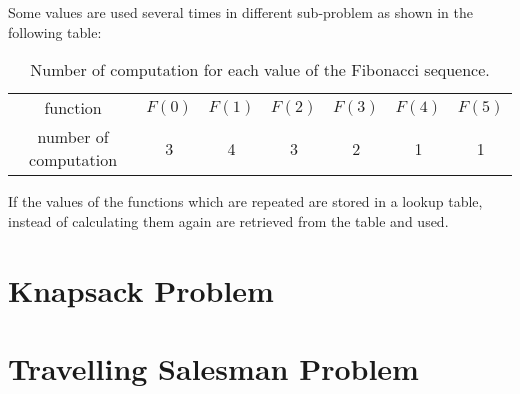Some values are used several times in different sub-problem as shown in the following table:
\begin{table}[H]
	\centering
	\begin{tabular}{c c c c c c c}
	function & $F(0)$ & $F(1)$ & $F(2)$ & $F(3)$ & $F(4)$ & $F(5)$ \\
	number of computation & 3 & 4 & 3 & 2 & 1 & 1
	\end{tabular}
	\caption[Number of computation for each value of the Fibonacci sequence.]{Number of computation for each value of the Fibonacci sequence.}
\end{table}
If the values of the functions which are repeated are stored in a lookup table, instead of calculating them again are retrieved from the table and used.

\section{Knapsack Problem}

\section{Travelling Salesman Problem}